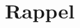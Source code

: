 \section*{Rappel}
\vspace{-0.5\baselineskip}
\begin{center}
    
\end{center}
\vspace{-\baselineskip}


%     

